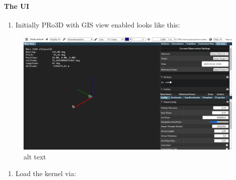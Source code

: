 \hypertarget{the-ui}{%
\paragraph{The UI}\label{the-ui}}

\begin{enumerate}
\def\labelenumi{\arabic{enumi}.}
\tightlist
\item
  Initially PRo3D with GIS view enabled looks like this:
\end{enumerate}

\begin{figure}
\centering
\includegraphics{./images/gis-view.png}
\caption{alt text}
\end{figure}

\begin{enumerate}
\def\labelenumi{\arabic{enumi}.}
\setcounter{enumi}{1}
\tightlist
\item
  Load the kernel via:
\end{enumerate}

